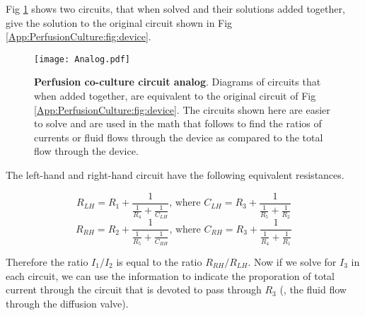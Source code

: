 Fig \ref{fig:circuit} shows two circuits, that when solved and their solutions added together, give the solution to the original circuit shown in Fig \ref{App:PerfusionCulture:fig:device}.

\begin{figure}[!ht]
\centering
\texttt{[image: Analog.pdf]}
\caption{\textbf{Perfusion co-culture circuit analog}. Diagrams of circuits that when added together, are equivalent to the original circuit of Fig \ref{App:PerfusionCulture:fig:device}. The circuits shown here are easier to solve and are used in the math that follows to find the ratios of currents or fluid flows through the device as compared to the total flow through the device.}
\label{fig:circuit}
\end{figure}

The left-hand and right-hand circuit have the following equivalent resistances.

\begin{equation}
R_{LH} = R_{1} + \frac{1}{\frac{1}{R_{4}} + \frac{1}{C_{LH}}}\textrm{, where } C_{LH} = R_{3} + \frac{1}{\frac{1}{R_{5}} + \frac{1}{R_{2}}}
\end{equation}
\begin{equation}
R_{RH} = R_{2} + \frac{1}{\frac{1}{R_{5}} + \frac{1}{C_{RH}}} \textrm{, where } C_{RH} = R_{3} + \frac{1}{\frac{1}{R_{4}} + \frac{1}{R_{1}}}
\end{equation}

Therefore the ratio $I_{1}/I_{2}$ is equal to the ratio $R_{RH}/R_{LH}$. Now if we solve for $I_{3}$ in each circuit, we can use the information to indicate the proporation of total current through the circuit that is devoted to pass through $R_{3}$ (\ie , the fluid flow through the diffusion valve).

